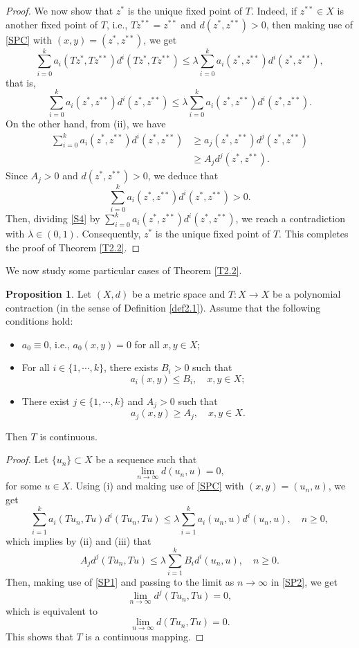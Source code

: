 \documentclass[letterpaper,12pt]{article}
\numberwithin{equation}{section}
\theoremstyle{definition}
\newtheorem{proposition}[theorem]{Proposition}
\theoremstyle{remark}
\begin{document}
\begin{proof}
We now show that $z^*$ is the unique fixed point of $T$. Indeed, if $z^{**}\in X$ is another fixed point of $T$, i.e., $Tz^{**}=z^{**}$ and $d(z^*,z^{**})>0$, then making use of \eqref{SPC} with $(x,y)=(z^*,z^{**})$, we get 
$$
\sum_{i=0}^ka_i(Tz^*,Tz^{**})d^i(Tz^*,Tz^{**})\leq \lambda \sum_{i=0}^k a_i(z^*,z^{**})d^i(z^*,z^{**}),	
$$ 
that is,
\begin{equation}\label{S4}
\sum_{i=0}^k a_i(z^*,z^{**})d^i(z^*,z^{**})\leq \lambda \sum_{i=0}^k a_i(z^*,z^{**})d^i(z^*,z^{**}).
\end{equation}
On the other hand, from	(ii), we have 
$$
\begin{aligned}
\sum_{i=0}^k a_i(z^*,z^{**})d^i(z^*,z^{**}) &\geq  a_j(z^*,z^{**})d^j(z^*,z^{**})\\
&\geq A_j d^j(z^*,z^{**}).
\end{aligned}
$$
Since $A_j>0$ and $d(z^*,z^{**})>0$, we deduce that 
$$
\sum_{i=0}^k a_i(z^*,z^{**})d^i(z^*,z^{**})>0. 
$$
Then, dividing  \eqref{S4} by $\sum_{i=0}^k a_i(z^*,z^{**})d^i(z^*,z^{**})$, we reach a contradiction with $\lambda\in (0,1)$. Consequently, $z^*$ is the unique fixed point of $T$. This completes the proof of Theorem \ref{T2.2}. 
\end{proof}

We now study some particular cases of Theorem \ref{T2.2}. 

\begin{proposition}\label{PR2.3}
Let $(X,d)$ be a metric space and $T: X\to X$ be a	polynomial contraction (in the sense of Definition \ref{def2.1}). Assume that the following conditions hold:
\begin{itemize}
\item[(i)] $a_0\equiv 0$, i.e., $a_0(x,y)=0$ for all $x,y\in X$;
\item[(ii)]For all $i\in\{1,\cdots,k\}$, there exists 	$B_i>0$ such that 
$$
a_i(x,y)\leq B_i,\quad x,y\in X;
$$
\item[(iii)] There exist $j\in\{1,\cdots,k\}$ and 	$A_j>0$ such that 
$$
a_j(x,y)\geq A_j,\quad x,y\in X.
$$
\end{itemize}
Then $T$ is continuous. 
\end{proposition}

\begin{proof}
Let $\{u_n\}\subset X$ be a sequence such that 
\begin{equation}\label{SP1}
\lim_{n\to \infty}d(u_n,u)=0,	
\end{equation}
for some $u\in X$. 	Using (i) and making use of \eqref{SPC} with $(x,y)=(u_n,u)$, we get 
$$
\sum_{i=1}^ka_i(Tu_n,Tu)d^i(Tu_n,Tu)\leq \lambda \sum_{i=1}^k a_i(u_n,u)d^i(u_n,u),\quad n\geq 0,
$$
which implies by (ii) and (iii) that 
\begin{equation}\label{SP2}
A_jd^j(Tu_n,Tu)\leq \lambda \sum_{i=1}^k B_id^i(u_n,u),\quad n\geq 0.
\end{equation}
Then, making use of \eqref{SP1} and passing to the limit as $n\to \infty$ in \eqref{SP2}, we get
$$
\lim_{n\to \infty}d^j(Tu_n,Tu)=0,
$$ 
which is equivalent to 
$$
\lim_{n\to \infty}d(Tu_n,Tu)=0.
$$  
This shows that $T$ is a continuous mapping. 
\end{proof}
\end{document}
